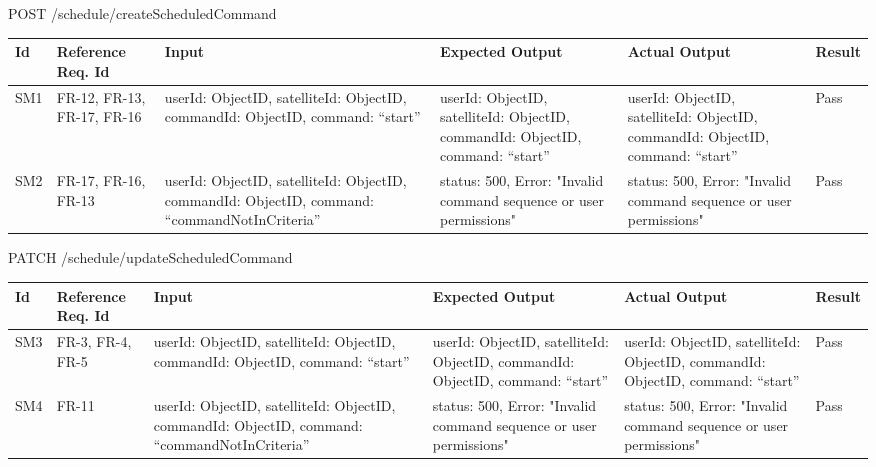 \documentclass[12pt, titlepage]{article}
\begin{document}
POST /schedule/createScheduledCommand


\begin{center}
\begin{tabular}{|p{1cm} | p{2cm} |p{2cm}| p{2cm} |p{2cm}| p{2cm}|}
\hline
\textbf{Id} & \textbf{Reference Req. Id} & \textbf{Input} & \textbf{Expected Output} & \textbf{Actual Output} & \textbf{Result} \\
\hline
SM1 & FR-12, FR-13, FR-17, FR-16  & { userId: ObjectID,
satelliteId: ObjectID,
commandId: ObjectID,
command: “start” } & { userId: ObjectID,
satelliteId: ObjectID,
commandId: ObjectID,
command: “start” } & { userId: ObjectID,
satelliteId: ObjectID,
commandId: ObjectID,
command: “start” } & Pass
\\
\hline
SM2 & FR-17, FR-16, FR-13 & { userId: ObjectID,
satelliteId: ObjectID,
commandId: ObjectID,
command: “commandNotInCriteria” }
 & { status: 500,
Error: "Invalid command sequence or user permissions" }
 & { status: 500,
Error: "Invalid command sequence or user permissions" }
 & Pass
\\
\hline

\end{tabular}

\end{center}

PATCH /schedule/updateScheduledCommand

\begin{center}
\begin{tabular}{|p{1cm} | p{2cm} |p{2cm}| p{2cm} |p{2cm}| p{2cm}|}
\hline
\textbf{Id} & \textbf{Reference Req. Id} & \textbf{Input} & \textbf{Expected Output} & \textbf{Actual Output} & \textbf{Result} \\
\hline
SM3 & FR-3, FR-4, FR-5 & { userId: ObjectID,
satelliteId: ObjectID,
commandId: ObjectID,
command: “start” } & { userId: ObjectID,
satelliteId: ObjectID,
commandId: ObjectID,
command: “start” } & { userId: ObjectID,
satelliteId: ObjectID,
commandId: ObjectID,
command: “start” } & Pass
\\
\hline
SM4 & FR-11 & { userId: ObjectID,
satelliteId: ObjectID,
commandId: ObjectID,
command: “commandNotInCriteria” }
 & { status: 500,
Error: "Invalid command sequence or user permissions" }
 & { status: 500,
Error: "Invalid command sequence or user permissions" }
 & Pass
\\
\hline

\end{tabular}

\end{center}
\end{document}
